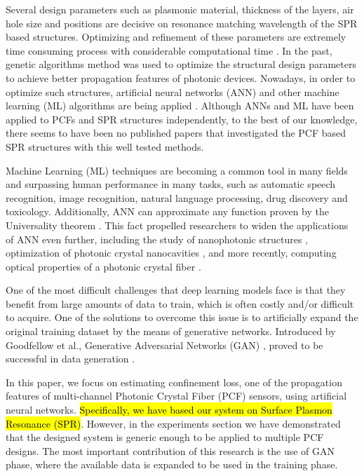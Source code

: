 \documentclass[10pt]{IEEEtran}
\begin{document}
Several design parameters such as plasmonic material, thickness of the layers, air hole size and positions are decisive on resonance matching wavelength of the SPR based structures. Optimizing and refinement of these parameters are extremely time consuming process with considerable computational time \cite{fornarelli2009neural,abdelaziz2012photonic,paper0}. In the past, genetic algorithms \cite{abdelaziz2012photonic,borel2004topology} method was used to optimize the structural design parameters to achieve better propagation features of photonic devices\cite{rifat2016highly,caucheteur2015review}. Nowadays, in order to optimize such structures, artificial neural networks (ANN) and other machine learning (ML) algorithms are being applied \cite{fornarelli2009neural,paper0,hameed2008accurate}. Although ANNs and ML have been applied to PCFs \cite{fornarelli2009neural,paper0} and SPR structures \cite{fu2018optimization,mcatee2019artificial} independently, to the best of our knowledge, there seems to have been no published papers that investigated the PCF based SPR structures with this well tested methods.

	
Machine Learning (ML) techniques are becoming a common tool in many fields and surpassing human performance in many tasks, such as automatic speech recognition, image recognition, natural language processing, drug discovery and toxicology. Additionally, ANN can approximate any function proven by the Universality theorem \cite{HORNIK1991251}. This fact propelled researchers to widen the applications of ANN even further, including the study of nanophotonic structures \cite{kiarashinejad2020knowledge}, optimization of photonic crystal nanocavities \cite{asano2018optimization}, and more recently, computing optical properties of a photonic crystal fiber \cite{paper0}.

One of the most difficult challenges that deep learning models face is that they benefit from large amounts of data to train, which is often costly and/or difficult to acquire. One of the solutions to overcome this issue is to artificially expand the original training dataset by the means of generative networks. Introduced by Goodfellow et al., Generative Adversarial Networks (GAN) \cite{goodfellow2014generative}, proved to be successful in data generation \cite{schlegl2017unsupervised, zheng2017unlabeled, frid2018synthetic, tanaka2019data, perez2017effectiveness}.

In this paper, we focus on estimating confinement loss, one of the propagation features of multi-channel Photonic Crystal Fiber (PCF) sensors, using artificial neural networks. \hl{Specifically, we have based our system on Surface Plasmon Resonance (SPR)}. However, in the experiments section we have demonstrated that the designed system is generic enough to be applied to multiple PCF designs. The most important contribution of this research is the use of GAN phase, where the available data is expanded to be used in the training phase.
\end{document}
